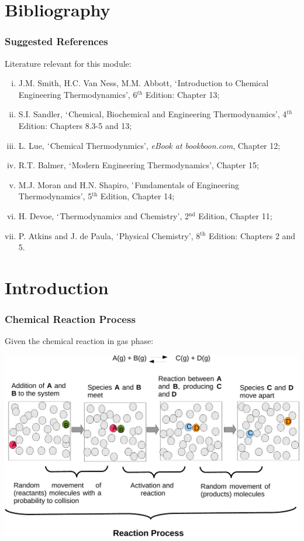 \documentclass[10pt,compress,unknownkeysallowed]{beamer}
\begin{document}
\section{Bibliography}
\begin{frame}
 \frametitle{Suggested References}
  Literature relevant for this module:
  \begin{enumerate}[(i)]
     \item\label{SVN_Book} J.M. Smith, H.C. Van Ness, M.M. Abbott, $\lq$Introduction to Chemical Engineering Thermodynamics', 6$^{th}$ Edition: Chapter 13;
     \item\label{Sandle_Book} S.I. Sandler, $\lq$Chemical, Biochemical and Engineering Thermodynamics', 4$^{th}$ Edition: Chapters 8.3-5 and 13;
     \item\label{Lue_Book} L. Lue, $\lq$Chemical Thermodynmics', {\it eBook at bookboon.com}, Chapter 12;
     \item\label{Balmer_Book}R.T. Balmer, $\lq$Modern Engineering Thermodynamics', Chapter 15;
     \item\label{Moran_Book} M.J. Moran and H.N. Shapiro, $\lq$Fundamentals of Engineering Thermodynamics', 5$^{\text{th}}$ Edition, Chapter 14;
     \item\label{Devoe_Book} H. Devoe, $\lq$Thermodynamics and Chemistry', 2$^{\text{nd}}$ Edition, Chapter 11;
     \item\label{Atkins_Book} P. Atkins and J. de Paula, $\lq$Physical Chemistry', 8$^{\text{th}}$ Edition: Chapters 2 and 5.
  \end{enumerate}
\end{frame}


\section{Introduction}

\begin{frame}
  \frametitle{Chemical Reaction Process}
      Given the chemical reaction in gas phase:

          \vspace{-.0cm}
          \includegraphics[width=.95\columnwidth,clip]{./../Pics/ChemicalReactionsDiagram2}
\end{frame}
\normalsize
\end{document}

